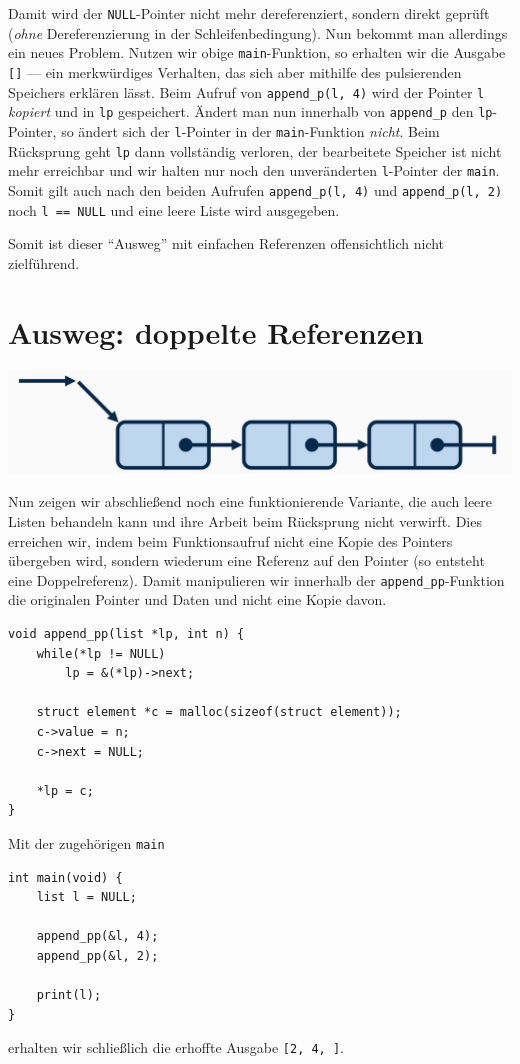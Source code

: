 \documentclass[ngerman, a4paper, 11pt]{scrartcl}
\begin{document}
Damit wird der \texttt{NULL}-Pointer nicht mehr dereferenziert, sondern direkt geprüft (\textit{ohne} Dereferenzierung in der Schleifenbedingung). Nun bekommt man allerdings ein neues Problem. Nutzen wir obige \texttt{main}-Funktion, so erhalten wir die Ausgabe \texttt{[]} --- ein merkwürdiges Verhalten, das sich aber mithilfe des pulsierenden Speichers erklären lässt. Beim Aufruf von \lstinline[]|append_p(l, 4)| wird der Pointer \texttt{l} \textit{kopiert} und in \texttt{lp} gespeichert. Ändert man nun innerhalb von \lstinline[]|append_p| den \texttt{lp}-Pointer, so ändert sich der \texttt{l}-Pointer in der \texttt{main}-Funktion \textit{nicht}. Beim Rücksprung geht \texttt{lp} dann vollständig verloren, der bearbeitete Speicher ist nicht mehr erreichbar und wir halten nur noch den unveränderten \texttt{l}-Pointer der \texttt{main}. Somit gilt auch nach den beiden Aufrufen \lstinline[]|append_p(l, 4)| und \lstinline[]|append_p(l, 2)| noch \lstinline{l == NULL} und eine leere Liste wird ausgegeben.

Somit ist dieser \enquote{Ausweg} mit einfachen Referenzen offensichtlich nicht zielführend.


\section{Ausweg: doppelte Referenzen}

\begin{center}
	\includegraphics[width=0.75\linewidth]{./tut06-graphics/tut06_doppelReferenz.jpg}
\end{center}

Nun zeigen wir abschließend noch eine funktionierende Variante, die auch leere Listen behandeln kann und ihre Arbeit beim Rücksprung nicht verwirft.
Dies erreichen wir, indem beim Funktionsaufruf nicht eine Kopie des Pointers übergeben wird, sondern wiederum eine Referenz auf den Pointer (so entsteht eine Doppelreferenz). Damit manipulieren wir innerhalb der \lstinline[]|append_pp|-Funktion die originalen Pointer und Daten und nicht eine Kopie davon.

\pagebreak

\begin{lstlisting}
void append_pp(list *lp, int n) {
	while(*lp != NULL)
		lp = &(*lp)->next;
	
	struct element *c = malloc(sizeof(struct element));
	c->value = n;
	c->next = NULL;
	
	*lp = c;
}
\end{lstlisting}

Mit der zugehörigen \texttt{main}
\begin{lstlisting}
int main(void) {
	list l = NULL;
	
	append_pp(&l, 4);
	append_pp(&l, 2);
	
	print(l);
}
\end{lstlisting}
erhalten wir schließlich die erhoffte Ausgabe \texttt{[2, 4, ]}.
\end{document}
